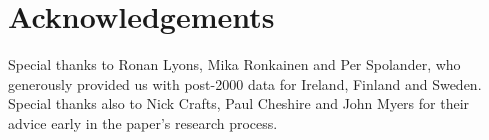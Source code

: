 \documentclass[11pt,a4paper]{article}
\begin{document}
\section*{Acknowledgements}

Special thanks to Ronan Lyons, Mika Ronkainen and Per Spolander, who generously provided us
with post-2000 data for Ireland, Finland and Sweden. Special thanks also to Nick Crafts,
Paul Cheshire and John Myers for their advice early in the paper's research process.
\end{document}
